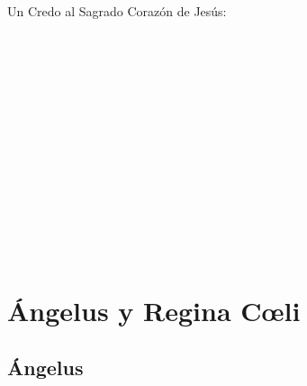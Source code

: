 \documentclass[10pt,oneside]{book}
\begin{document}
Un Credo al Sagrado Corazón de Jesús:
\begin{paracol}{2}  
      \\
      \\
      \\[2mm]
      \\
      \\[1mm]
      \\[1mm]
       
      
      \switchcolumn
      
      \\
      \\
      \\[2mm]
      \\
      \\[1mm]
      \\[-2mm]
                                                                            
\end{paracol}
\chapter*{Ángelus y Regina C{\oe}li}

\section*{Ángelus}

\begin{paracol}{2}  
      
      
      \switchcolumn
      
                                                                        
\end{paracol}
\end{document}
